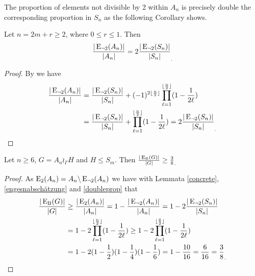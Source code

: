 The proportion of elements not divisible by 2 within $A_n$ is precisely double the corresponding proportion in $S_n$ as the following Corollary shows.
\begin{cor}\label{doubleprop}
Let $n = 2m + r \geq 2$, where $0 \leq r \leq 1$. Then
\[\frac{|\Eneg2(A_n)|}{|A_n|}=2\frac{|\Eneg2(S_n)|}{|S_n|}_.\]
\end{cor}
\begin{proof}
By \cite[Theorem 3.3 (a), p.8]{beals2002permutations} we have
\begin{align*}
\frac{|\E_{\neg 2}(A_n)|}{|A_n|}
&=\frac{|\E_{\neg 2}(S_n)|}{|S_n|}+(-1)^{2\lfloor\frac{n}{2}\rfloor} \prod_{\ell=1}^{\lfloor\frac{n}{2}\rfloor}(1-\frac{1}{2 \ell})\\
&=\frac{|\E_{\neg 2}(S_n)|}{|S_n|}+\prod_{\ell=1}^{\lfloor\frac{n}{2}\rfloor}(1-\frac{1}{2 \ell})=2\frac{|\Eneg2(S_n)|}{|S_n|}_.
\end{align*}
\end{proof}




\begin{lem}\label{lemmapropbasered}
Let $n\geq 6$, $G=A_n\wr_\Gamma H$ and $H\leq S_m$. %
Then $\frac{|\operatorname{E_{B}}(G)|}{|G|}\geq \frac{3}{8}_.$
\end{lem}
\begin{proof}
As $\operatorname{E}_2(A_n)=A_n\backslash \operatorname{E}_{\neg 2}(A_n)$ we have with Lemmata \ref{concrete}, \ref{engesnabschätzung} and \ref{doubleprop} that
\begin{align*}
\frac{|\EB(G)|}{|G|}&\geq\frac{|\E_2(A_n)|}{|A_n|}=1-\frac{|\Eneg2(A_n)|}{|A_n|}= 1-2\frac{|\Eneg2(S_n)|}{|S_n|}\\
&=1-2\prod_{\ell=1}^{\lfloor\frac{n}{2}\rfloor}(1-\frac{1}{2 \ell})
\geq 1-2\prod_{\ell=1}^{\lfloor\frac{6}{2}\rfloor}(1-\frac{1}{2 \ell})\\
&=1-2(1-\frac{1}{2})(1-\frac{1}{4})(1-\frac{1}{6})=1-\frac{10}{16}=\frac{6}{16}=\frac{3}{8}_.
\end{align*}
\end{proof}



